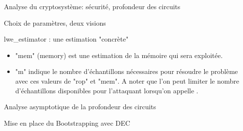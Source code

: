 \begin{section}{Analyse du cryptosystème: sécurité, profondeur des circuits}
\begin{subsection}{Choix de paramètres, deux visions}
\begin{subsubsection}{lwe\_estimator : une estimation "concrète"}
\begin{itemize}
	\item "mem" (memory) est une estimation de la mémoire qui sera exploitée.
	
	\item "m" indique le nombre d'échantillons nécessaires pour résoudre le problème avec ces valeurs de
	"rop" et "mem". A noter que l'on peut limiter le nombre d'échantillons disponibles pour l'attaquant
	lorsqu'on appelle .
	\end{itemize}

	\end{subsubsection}
	\end{subsection}
	\begin{subsection}{Analyse asymptotique de la profondeur des circuits}
	\end{subsection}
	\begin{subsection}{Mise en place du Bootstrapping avec DEC}
	\end{subsection}
\end{section}
